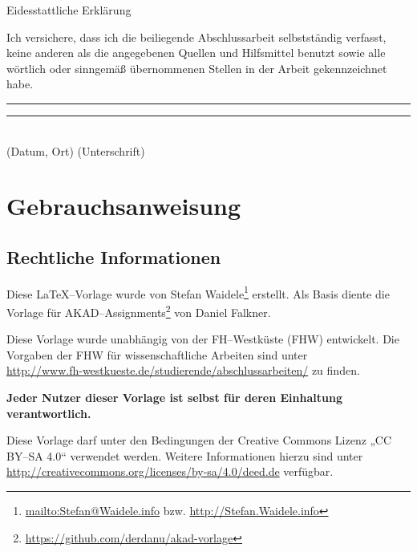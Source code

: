 \documentclass[a4paper,12pt]{article}
\newif\ifsperrvermerk
\newif\ifichweissdassichfuerdieeinhaltungdervorgabenselbstverantwortlichbin
\begin{document}
\vspace*{\fill}
\vfill
\vfill
\begin{center}
{\Large Eidesstattliche Erklärung}
\end{center}
\vfill
\noindent
Ich versichere, dass ich die beiliegende Abschlussarbeit selbstständig verfasst, keine anderen als die angegebenen Quellen und Hilfsmittel benutzt sowie alle wörtlich oder sinngemäß übernommenen Stellen in der Arbeit gekennzeichnet habe. 
\vfill
\vfill
\vfill
\rule[0.5ex]{6.5cm}{1pt}
\hspace{1.3cm}
\rule[0.5ex]{6.5cm}{1pt}
\\(Datum, Ort)
\hspace{6.3cm}
(Unterschrift)
\vfill
\vfill
\vfill
\ifsperrvermerk
\begin{center}
{\Large Sperrvermerk}
\end{center}
\vfill
Diese Arbeit enthält vertrauliche Daten und Informationen des betreuenden
Unternehmens. Sie darf Dritten deshalb nicht zugänglich gemacht werden.

Die drei für die Prüfung notwendigen Exemplare verbleiben beim Prüfungsamt und bei
den beiden betreuenden Hochschullehrern.
\fi
\vfill
\vfill
\vfill
\clearpage

\ifichweissdassichfuerdieeinhaltungdervorgabenselbstverantwortlichbin
\else
\section*{Gebrauchsanweisung}
\label{sec:gebrauchsanweisung}
\subsection*{Rechtliche Informationen}
Diese \LaTeX--Vorlage wurde von Stefan Waidele\footnote{\url{mailto:Stefan@Waidele.info} bzw. \url{http://Stefan.Waidele.info}} erstellt. Als Basis diente die Vorlage für AKAD--Assignments\footnote{\url{https://github.com/derdanu/akad-vorlage}} von Daniel Falkner.

Diese Vorlage wurde unabhängig von der FH--Westküste (FHW) entwickelt. Die Vorgaben der FHW für wissenschaftliche Arbeiten sind unter\\ \url{http://www.fh-westkueste.de/studierende/abschlussarbeiten/} zu finden. 

\textbf{Jeder Nutzer dieser Vorlage ist selbst für deren Einhaltung verantwortlich.}

Diese Vorlage darf unter den Bedingungen der Creative Commons Lizenz „CC BY–SA 4.0“ verwendet werden. Weitere Informationen hierzu sind unter \url{http://creativecommons.org/licenses/by-sa/4.0/deed.de} verfügbar.
\end{document}
